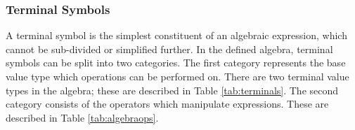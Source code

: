 \subsubsection{Terminal Symbols}
A terminal symbol is the simplest constituent of an algebraic expression, which cannot be sub-divided or simplified further. In the defined algebra, terminal symbols can be split into two categories. The first category represents the base value type which operations can be performed on. There are two terminal value types in the algebra; these are described in Table \ref{tab:terminals}. The second category consists of the operators which manipulate expressions. These are described in Table \ref{tab:algebraops}.
\begin{table}[!ht]
    \centering
    \caption{Terminal Value Symbols}
    \label{tab:terminals}
\end{table}

